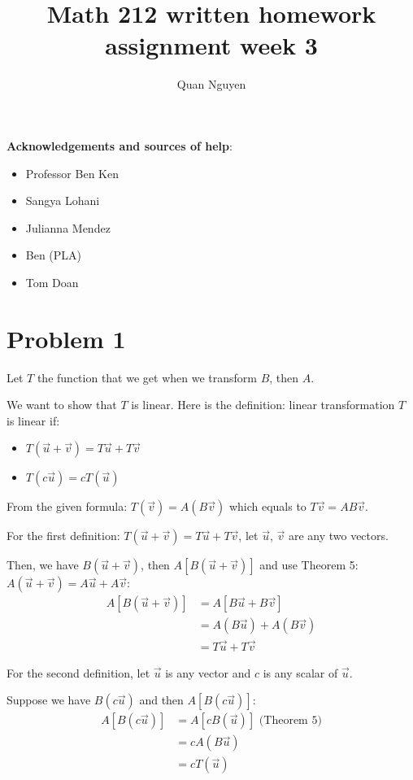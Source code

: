 \documentclass[10pt]{article}
\begin{document}
\title{Math 212 written homework assignment week 3}
\author{Quan Nguyen}
\maketitle

\bigskip
\noindent
{\bf Acknowledgements and sources of help}:
\begin{itemize}
    \item Professor Ben Ken
    \item Sangya Lohani
    \item Julianna Mendez
    \item Ben (PLA)
    \item Tom Doan
\end{itemize}

\bigskip
\noindent

\section*{Problem 1}

\noindent Let $T$ the function that we get when we transform $B$, then $A$.\par
\noindent We want to show that $T$ is linear. Here is the definition: linear transformation $T$ is linear if:
\begin{itemize}
    \item $T(\Vec{u} + \Vec{v}) = T\Vec{u} + T\Vec{v}$
    \item $T(c\Vec{u}) = cT(\Vec{u})$
\end{itemize}

\noindent From the given formula: $T(\Vec{v}) = A(B\Vec{v})$ which equals to $ T\Vec{v} = AB\Vec{v}$.\par

\noindent For the first definition: $T(\Vec{u} + \Vec{v}) = T\Vec{u} + T\Vec{v}$, let $\Vec{u}$, $\Vec{v}$ are any two vectors.\par

\noindent Then, we have $B(\Vec{u} + \Vec{v})$, then $A[B(\Vec{u} + \Vec{v})]$ and use Theorem 5: $A(\Vec{u} + \Vec{v}) = A\Vec{u} + A\Vec{v}$:
\begin{align*}
    A[B(\Vec{u} + \Vec{v})]
    &= A[B\Vec{u} + B\Vec{v}] \\
    &= A(B\Vec{u}) + A(B\Vec{v}) \\
    &= T\Vec{u} + T\Vec{v}
\end{align*}
\par

\noindent For the second definition, let $\Vec{u}$ is any vector and $c$ is any scalar of $\Vec{u}$. \par
\noindent Suppose we have $B(c\Vec{u})$ and then $A[B(c\Vec{u})]$:
\begin{align*}
    A[B(c\Vec{u})] &= A[cB(\Vec{u})] \text{  (Theorem 5)}\\
    &= cA(B\Vec{u}) \\
    &= cT(\Vec{u})
\end{align*}
\end{document}
